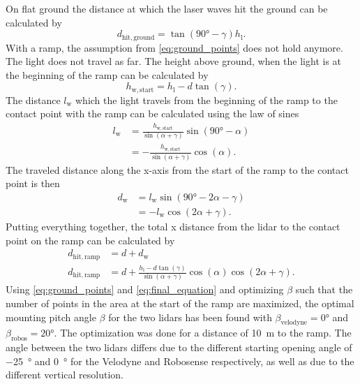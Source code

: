 On flat ground the distance at which the laser waves hit the ground can be calculated by
\begin{equation}
	d_\mathrm{hit,ground}  = \tan(\ang{90} - \gamma) h_\mathrm{l}.
	\label{eq:ground_points}
\end{equation}
With a ramp, the assumption from \cref{eq:ground_points} does not hold anymore.
The light does not travel as far.
The height above ground, when the light is at the beginning of the ramp can be calculated by
\begin{equation}
	h_\mathrm{w,start} = h_\mathrm{l} - d\tan(\gamma).
\end{equation}
The distance $l_\mathrm{w}$ which the light travels from the beginning of the ramp to the contact point with the ramp can be calculated using the law of sines
\begin{align}
	l_\mathrm{w} & = \frac{h_\mathrm{w,start} }{\sin(\alpha + \gamma)} \sin(\ang{90} - \alpha) \nonumber \\
	             & = -\frac{h_\mathrm{w,start} }{\sin(\alpha + \gamma)} \cos(\alpha).
\end{align}
The traveled distance along the x-axis from the start of the ramp to the contact point is then
\begin{align}
	d_\mathrm{w} & = l_\mathrm{w} \sin(\ang{90} - 2\alpha - \gamma) \nonumber \\
	             & = -l_\mathrm{w} \cos(2\alpha + \gamma).
\end{align}
Putting everything together, the total x distance from the \gls{lidar} to the contact point on the ramp can be calculated by
\begin{align}
	d_\mathrm{hit,ramp} & = d + d_\mathrm{w}                                                                                    \nonumber \\
	d_\mathrm{hit,ramp} & = d + \frac{h_\mathrm{l} - d\tan(\gamma)}{\sin(\alpha + \gamma)} \cos(\alpha) \cos(2\alpha + \gamma).
	\label{eq:final_equation}
\end{align}
Using \cref{eq:ground_points} and \cref{eq:final_equation} and optimizing $\beta$ such that the number of points in the area at the start of the ramp are maximized, the optimal mounting pitch angle $\beta$ for the two \glspl{lidar} has been found with $\beta_\mathrm{velodyne} = \ang{0}$ and $\beta_\mathrm{robos} = \ang{20}$.
The optimization was done for a distance of \SI{10}{\metre} to the ramp.
The angle between the two \glspl{lidar} differs due to the different starting opening angle of \SI{-25}{\degree} and \SI{0}{\degree} for the Velodyne and Robosense respectively, as well as due to the different vertical resolution.
